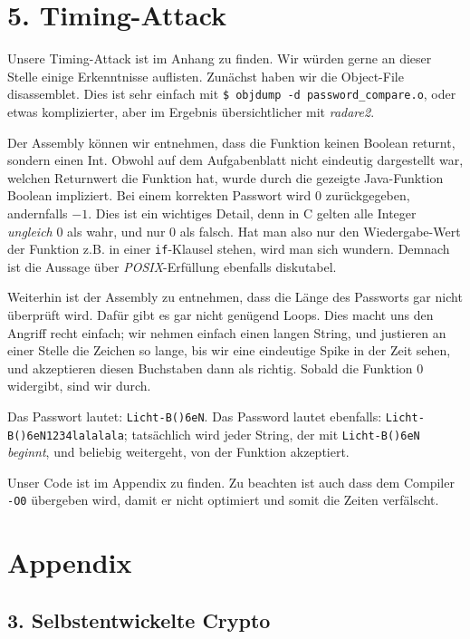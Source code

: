 \documentclass[10pt,a4paper]{article}
\begin{document}
\setcounter{section}{5}
\section*{5. Timing-Attack}
\setcounter{subsection}{0}

Unsere Timing-Attack ist im Anhang zu finden. Wir würden gerne an dieser Stelle einige Erkenntnisse auflisten.
Zunächst haben wir die Object-File disassemblet. Dies ist sehr einfach mit \texttt{\$ objdump -d password\_compare.o},
oder etwas komplizierter, aber im Ergebnis übersichtlicher mit \textit{radare2}.

Der Assembly können wir entnehmen, dass die Funktion keinen Boolean returnt, sondern einen Int. Obwohl auf dem
Aufgabenblatt nicht eindeutig dargestellt war, welchen Returnwert die Funktion hat, wurde durch die gezeigte
Java-Funktion Boolean impliziert. Bei einem korrekten Passwort wird $0$ zurückgegeben, andernfalls $-1$.
Dies ist ein wichtiges Detail, denn in C gelten alle Integer \textit{ungleich} $0$ als wahr, und nur $0$ als falsch.
Hat man also nur den Wiedergabe-Wert der Funktion z.B. in einer \texttt{if}-Klausel stehen, wird man sich wundern.
Demnach ist die Aussage über \textit{POSIX}-Erfüllung ebenfalls diskutabel.

Weiterhin ist der Assembly zu entnehmen, dass die Länge des Passworts gar nicht überprüft wird. Dafür gibt es gar nicht genügend
Loops. Dies macht uns den Angriff recht einfach; wir nehmen einfach einen langen String, und justieren an einer Stelle
die Zeichen so lange, bis wir eine eindeutige Spike in der Zeit sehen, und akzeptieren diesen Buchstaben dann als richtig.
Sobald die Funktion $0$ widergibt, sind wir durch.

Das Passwort lautet: \texttt{Licht-B()6eN}. Das Password lautet ebenfalls: \texttt{Licht-B()6eN1234lalalala};
tatsächlich wird jeder String, der mit \texttt{Licht-B()6eN} \textit{beginnt}, und beliebig weitergeht, von der Funktion akzeptiert.

Unser Code ist im Appendix zu finden. Zu beachten ist auch dass dem Compiler \texttt{-O0} übergeben wird,
damit er nicht optimiert und somit die Zeiten verfälscht.


\newpage
\section*{Appendix}
\subsection{3. Selbstentwickelte Crypto}
\end{document}
